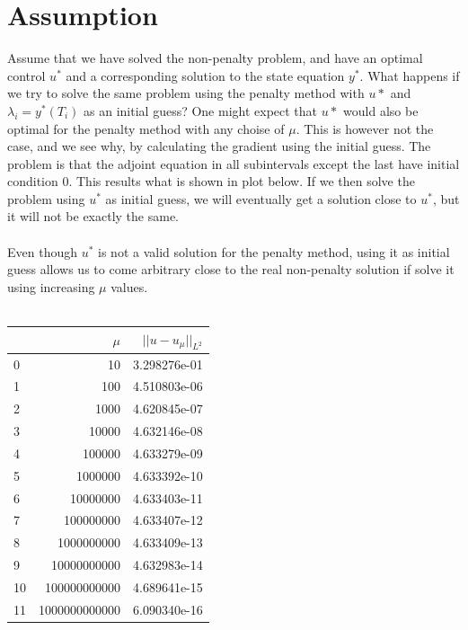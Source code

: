 \documentclass[11pt,a4paper]{report}
\begin{document}
\section{Assumption}
Assume that we have solved the non-penalty problem, and have an optimal control $u^*$ and a corresponding solution to the state equation $y^*$. What happens if we try to solve the same problem using the penalty method with $u*$ and $\lambda_i =y^*(T_i)$ as an initial guess? One might expect that $u*$ would also be optimal for the penalty method with any choise of $\mu$. This is however not the case, and we see why, by calculating the gradient using the initial guess. The problem is that the adjoint equation in all subintervals except the last have initial condition 0. This results what is shown in plot below. If we then solve the problem using $u^*$ as initial guess, we will eventually get a solution close to $u^*$, but it will not be exactly the same.
\\
\\
Even though $u^*$ is not a valid solution for the penalty method, using it as initial guess allows us to come arbitrary close to the real non-penalty solution if solve it using increasing $\mu$ values.
\\
\\ 
\begin{tabular}{lrr}
\toprule
{} &             $\mu$ &    $||u-u_{\mu}||_{L^2}$ \\
\midrule
0  &             10 &  3.298276e-01 \\
1  &            100 &  4.510803e-06 \\
2  &           1000 &  4.620845e-07 \\
3  &          10000 &  4.632146e-08 \\
4  &         100000 &  4.633279e-09 \\
5  &        1000000 &  4.633392e-10 \\
6  &       10000000 &  4.633403e-11 \\
7  &      100000000 &  4.633407e-12 \\
8  &     1000000000 &  4.633409e-13 \\
9  &    10000000000 &  4.632983e-14 \\
10 &   100000000000 &  4.689641e-15 \\
11 &  1000000000000 &  6.090340e-16 \\
\bottomrule
\end{tabular}
\end{document}
